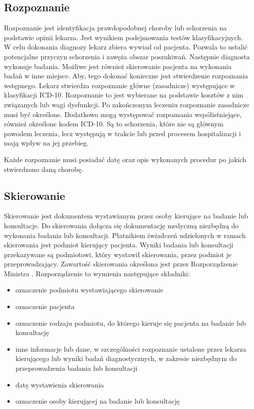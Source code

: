 \subsection{Rozpoznanie}
\label{subsec:rozpoznanie}
Rozpoznanie jest identyfikacja prawdopodobnej choroby lub schorzenia na podstawie opinii lekarza. Jest wynikiem podejmowania testów klasyfikacyjnych. W celu dokonania diagnozy lekarz zbiera wywiad od pacjenta. Pozwala to ustalić potencjalne przyczyn schorzenia i zawęża obszar poszukiwań. Następnie diagnosta wykonuje badania. Możliwe jest również skierowanie pacjenta na wykonania badań w inne miejsce. Aby, tego dokonać konieczne jest stwierdzenie rozpoznania wstępnego. Lekarz stwierdza rozpoznanie główne (zasadnicze) występujące w klasyfikacji ICD-10. Rozpoznanie to jest wybierane na podstawie kosztów z nim związanych lub wagi dysfunkcji. Po zakończonym leczeniu rozpoznanie zasadnicze musi być określone. Dodatkowo mogą występować rozpoznania współistniejące, również określone kodem ICD-10. Są to schorzenia, które nie są głównym powodem leczenia, lecz występują w trakcie lub przed procesem hospitalizacji i mają wpływ na jej przebieg.

Każde rozpoznanie musi posiadać datę oraz opis wykonanych procedur po jakich stwierdzono daną chorobę.
\subsection{Skierowanie}
\label{subsec:skierowanie}
Skierowanie jest dokumentem wystawianym przez osoby kierujące na badanie lub konsultacje. Do skierowania dołącza się dokumentację medyczną niezbędną do wykonania badania lub konsultacji. Płatnikiem świadczeń udzielonych w ramach skierowania jest podmiot kierujący pacjenta. Wyniki badania lub konsultacji przekazywane są podmiotowi, który wystawił skierowania, przez podmiot je przeprowadzający. Zawartość skierowania określona jest przez Rozporządzenie Ministra \cite{mz:rzdm:online}. Rozporządzenie to wymienia następujące składniki:
\begin{itemize}
\item oznaczenie podmiotu wystawiającego skierowanie
\item oznaczenie pacjenta
\item oznaczenie rodzaju podmiotu, do którego kieruje się pacjenta na badanie lub konsultację
\item inne informacje lub dane, w szczególności rozpoznanie ustalone przez lekarza kierującego lub wyniki badań diagnostycznych, w zakresie niezbędnym do przeprowadzenia badania lub konsultacji
\item datę wystawienia skierowania
\item oznaczenie osoby kierującej na badanie lub konsultację
\end{itemize}

